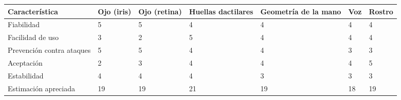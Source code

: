 \begin{tabular}{|C{2.9cm}|C{1cm}|C{1.5cm}|C{1.8cm}|C{2.1cm}|C{1cm}|C{1.3cm}|}
  \hline
  Característica & Ojo (iris) & Ojo (retina) & Huellas dactilares & Geometría de la mano & Voz & Rostro \\
  \hline
  Fiabilidad & 5 & 5 & 4 & 4 & 4 & 4 \\
  \hline
  Facilidad de uso & 3 & 2 & 5 & 4 & 4 & 4 \\
  \hline
  Prevención contra ataques & 5 & 5 & 4 & 4 & 3 & 3 \\
  \hline
  Aceptación & 2 & 3 & 4 & 4 & 4 & 5 \\
  \hline
  Estabilidad & 4 & 4 & 4 & 3 & 3 & 3 \\
  \hline
  Estimación apreciada & 19 & 19 & 21 & 19 & 18 & 19 \\
  \hline
\end{tabular}